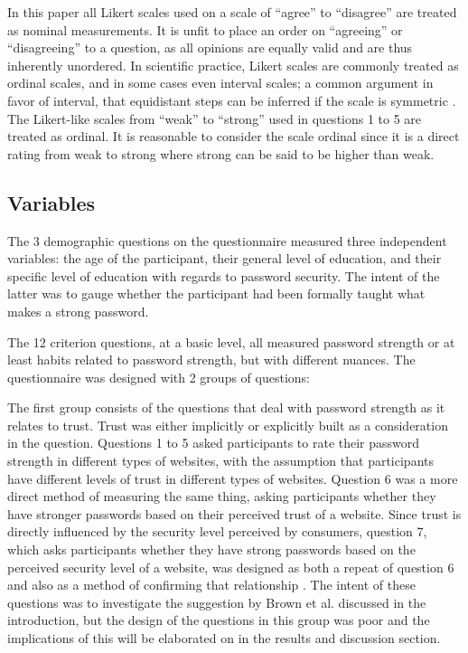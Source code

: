 \documentclass[letterpaper, 10 pt, conference]{ieeeconf}  %
\begin{document}
In this paper all Likert scales used on a scale of “agree” to “disagree” are treated as nominal measurements. It is unfit to place an order on “agreeing” or “disagreeing” to a question, as all opinions are equally valid and are thus inherently unordered. In scientific practice, Likert scales are commonly treated as ordinal scales, and in some cases even interval scales; a common argument in favor of interval, that equidistant steps can be inferred if the scale is symmetric \cite{Norman2010}. The Likert-like scales from “weak” to “strong” used in questions 1 to 5 are treated as ordinal. It is reasonable to consider the scale ordinal since it is a direct rating from weak to strong where strong can be said to be higher than weak.

\subsection{Variables}

The 3 demographic questions on the questionnaire measured three independent variables: the age of the participant, their general level of education, and their specific level of education with regards to password security. The intent of the latter was to gauge whether the participant had been formally taught what makes a strong password. 

The 12 criterion questions, at a basic level, all measured password strength or at least habits related to password strength, but with different nuances. The questionnaire was designed with 2 groups of questions:

The first group consists of the questions that deal with password strength as it relates to trust. Trust was either implicitly or explicitly built as a consideration in the question. Questions 1 to 5 asked participants to rate their password strength in different types of websites, with the assumption that participants have different levels of trust in different types of websites. Question 6 was a more direct method of measuring the same thing, asking participants whether they have stronger passwords based on their perceived trust of a website. Since trust is directly influenced by the security level perceived by consumers, question 7, which asks participants whether they have strong passwords based on the perceived security level of a website, was designed as both a repeat of question 6 and also as a method of confirming that relationship \cite{Flavian2006}. The intent of these questions was to investigate the suggestion by Brown et al. \cite{Brown2004} discussed in the introduction, but the design of the questions in this group was poor and the implications of this will be elaborated on in the results and discussion section.
\end{document}
